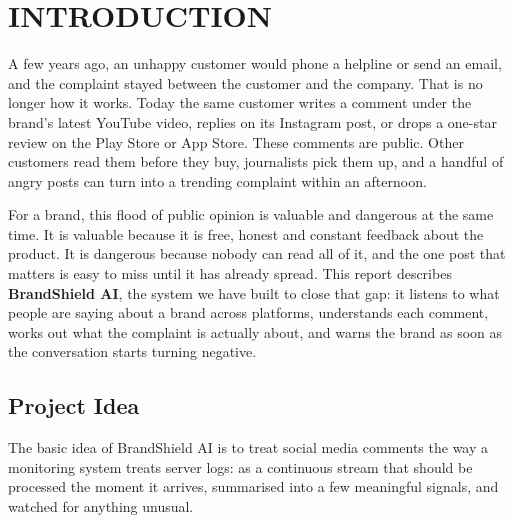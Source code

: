 \documentclass[12pt,a4paper]{report}
\begin{document}
\setlength{\parindent}{11mm}
\setlength{\parskip}{4pt}

\chapter{INTRODUCTION}

A few years ago, an unhappy customer would phone a helpline or send an email, and the complaint stayed between the customer and the company. That is no longer how it works. Today the same customer writes a comment under the brand's latest YouTube video, replies on its Instagram post, or drops a one-star review on the Play Store or App Store. These comments are public. Other customers read them before they buy, journalists pick them up, and a handful of angry posts can turn into a trending complaint within an afternoon.

For a brand, this flood of public opinion is valuable and dangerous at the same time. It is valuable because it is free, honest and constant feedback about the product. It is dangerous because nobody can read all of it, and the one post that matters is easy to miss until it has already spread. This report describes \textbf{BrandShield AI}, the system we have built to close that gap: it listens to what people are saying about a brand across platforms, understands each comment, works out what the complaint is actually about, and warns the brand as soon as the conversation starts turning negative.

\section{Project Idea}

The basic idea of BrandShield AI is to treat social media comments the way a monitoring system treats server logs: as a continuous stream that should be processed the moment it arrives, summarised into a few meaningful signals, and watched for anything unusual.
\end{document}

